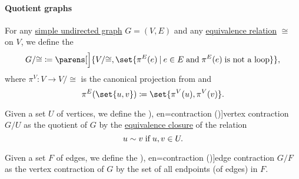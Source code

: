 \paragraph{Quotient graphs}

\begin{definition}\label{def:quotient_graph}\mimprovised
  For any \hyperref[def:undirected_graph]{simple undirected graph} \( G = (V, E) \) and any \hyperref[def:equivalence_relation]{equivalence relation} \( {\cong} \) on \( V \), we define the 
  \begin{equation*}
    G / {\cong} \coloneqq \parens[\Big]{ V / {\cong}, \set{ \pi^E(e) \given e \in E \T{and} \pi^E(e) \T{is not a loop} } },
  \end{equation*}
  where \( \pi^V: V \to V / {\cong} \) is the canonical projection from  and
  \begin{equation*}
    \pi^E(\set{ u, v }) \coloneqq \set{ \pi^V(u), \pi^V(v) }.
  \end{equation*}

  \begin{thmenum}
     Given a set \( U \) of vertices, we define the \term[ru=отождествление вершин (\cite[22]{Емеличев1990}), en=contraction (\cite[532]{Rosen1999})]{vertex contraction} \( G / U \) as the quotient of \( G \) by the \hyperref[thm:equivalence_closure]{equivalence closure} of the relation
    \begin{equation*}
      u \sim v \T{if} u, v \in U.
    \end{equation*}

     Given a set \( F \) of edges, we define the \term[ru=стягивание ребра (\cite[21]{Емеличев1990}), en=contraction (\cite[532]{Rosen1999})]{edge contraction} \( G / F \) as the vertex contraction of \( G \) by the set of all endpoints (of edges) in \( F \).
  \end{thmenum}
\end{definition}
